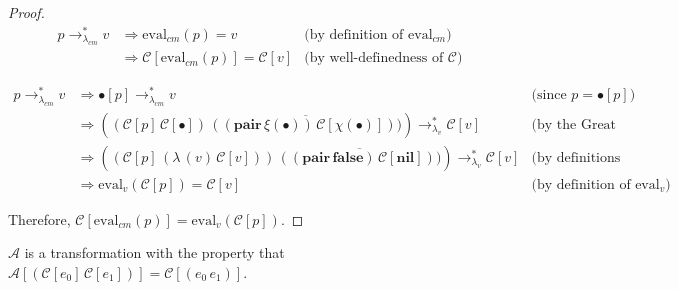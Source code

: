 \documentclass[ms,electronic,twosidetoc,letterpaper,chaptercenter,parttop]{byumsphd}
\begin{document}
\begin{proof}

\begin{align*}
p\rightarrow_{\lambda_{cm}}^{*}v &\Rightarrow\mathrm{eval}_{cm}(p)=v &\text{(by definition of $\mathrm{eval}_{cm}$)}\\
                             &\Rightarrow\mathcal{C}[\mathrm{eval}_{cm}(p)]=\mathcal{C}[v] &\text{(by well-definedness of $\mathcal{C}$)}
\end{align*}

\begin{align*}
p\rightarrow_{\lambda_{cm}}^{*}v &\Rightarrow\bullet[p]\rightarrow_{\lambda_{cm}}^{*}v &\text{(since $p=\bullet[p]$)}\\
                             &\Rightarrow((\mathcal{C}[p]\,\mathcal{C}[\bullet])\,\overline{((\mathbf{pair}\,\xi(\bullet))\,\mathcal{C}[\chi(\bullet)]))})\rightarrow_{\lambda_v}^{*} \mathcal{C}[v] &\text{(by the Great Lemma)}\\
                             &\Rightarrow((\mathcal{C}[p]\,(\lambda\,(v)\,\mathcal{C}[v]))\,\overline{((\mathbf{pair}\,\mathbf{false})\,\mathcal{C}[\mathbf{nil}]))})\rightarrow_{\lambda_v}^{*} \mathcal{C}[v] &\text{(by definitions x, y, and z)}\\
                             &\Rightarrow\mathrm{eval}_{v}(\mathcal{C}[p])=\mathcal{C}[v] &\text{(by definition of $\mathrm{eval}_v$)}
\end{align*}

Therefore, $\mathcal{C}[\mathrm{eval}_{cm}(p)]=\mathrm{eval}_{v}(\mathcal{C}[p])$.
\end{proof}

$\mathcal{A}$ is a transformation with the property that $\mathcal{A}[(\mathcal{C}[e_0]\,\mathcal{C}[e_1])]=\mathcal{C}[(e_0\,e_1)]$.

\end{document}
